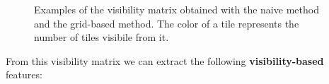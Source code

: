 \documentclass{Configuration_Files/PoliMi3i_thesis}
\begin{document}
\begin{figure}[hbt!]
    \centering
    \qquad
    \caption[Visibility comparison]{Examples of the visibility matrix obtained with the naive method and the grid-based method. The color of a tile represents the number of tiles visibile from it.}
    \label{fig:visibility_example}
\end{figure}

From this visibility matrix we can extract the following \textbf{visibility-based} features:
\end{document}
